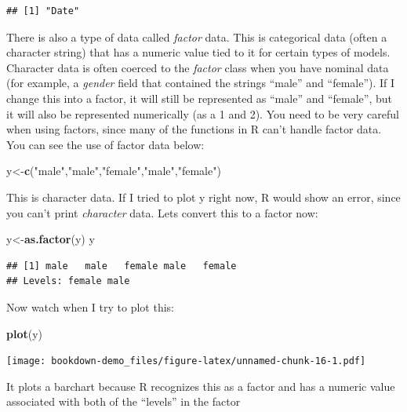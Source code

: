 \documentclass[]{book}
\newenvironment{Shaded}{\begin{snugshade}}{\end{snugshade}}
\newcommand{\KeywordTok}[1]{\textcolor[rgb]{0.13,0.29,0.53}{\textbf{{#1}}}}
\newcommand{\StringTok}[1]{\textcolor[rgb]{0.31,0.60,0.02}{{#1}}}
\newcommand{\NormalTok}[1]{{#1}}
\begin{document}
\begin{verbatim}
## [1] "Date"
\end{verbatim}

There is also a type of data called \emph{factor} data. This is
categorical data (often a character string) that has a numeric value
tied to it for certain types of models. Character data is often coerced
to the \emph{factor} class when you have nominal data (for example, a
\emph{gender} field that contained the strings ``male'' and ``female'').
If I change this into a factor, it will still be represented as ``male''
and ``female'', but it will also be represented numerically (as a 1 and
2). You need to be very careful when using factors, since many of the
functions in R can't handle factor data. You can see the use of factor
data below:

\begin{Shaded}
\begin{Highlighting}[]
\NormalTok{y<-}\KeywordTok{c}\NormalTok{(}\StringTok{"male"}\NormalTok{,}\StringTok{"male"}\NormalTok{,}\StringTok{"female"}\NormalTok{,}\StringTok{"male"}\NormalTok{,}\StringTok{"female"}\NormalTok{)}
\end{Highlighting}
\end{Shaded}

This is character data. If I tried to plot y right now, R would show an
error, since you can't print \emph{character} data. Lets convert this to
a factor now:

\begin{Shaded}
\begin{Highlighting}[]
\NormalTok{y<-}\KeywordTok{as.factor}\NormalTok{(y)}
\NormalTok{y}
\end{Highlighting}
\end{Shaded}

\begin{verbatim}
## [1] male   male   female male   female
## Levels: female male
\end{verbatim}

Now watch when I try to plot this:

\begin{Shaded}
\begin{Highlighting}[]
\KeywordTok{plot}\NormalTok{(y)}
\end{Highlighting}
\end{Shaded}

\texttt{[image: bookdown-demo\_files/figure-latex/unnamed-chunk-16-1.pdf]}

It plots a barchart because R recognizes this as a factor and has a
numeric value associated with both of the ``levels'' in the factor
\end{document}
